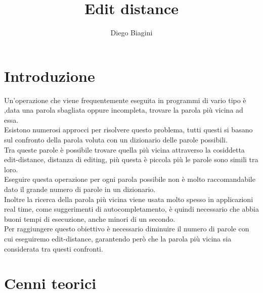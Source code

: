 \documentclass[]{article}
\author{Diego Biagini}
\title{Edit distance}
\begin{document}
\maketitle
\newpage
\section{Introduzione}
Un'operazione che viene frequentemente eseguita in programmi di vario tipo è ,data una parola sbagliata oppure incompleta, trovare la parola più vicina ad essa.\\
Esistono numerosi approcci per risolvere questo problema, tutti questi si basano sul confronto della parola voluta con un dizionario delle parole possibili.\\
Tra queste parole è possibile trovare quella più vicina attraverso la cosiddetta edit-distance, distanza di editing, più questa è piccola più le parole sono simili tra loro.\\
Eseguire questa operazione per ogni parola possibile non è molto raccomandabile dato il grande numero di parole in un dizionario.\\
Inoltre la ricerca della parola più vicina viene usata molto spesso in applicazioni real time, come suggerimenti di autocompletamento, è quindi necessario che abbia buoni tempi di esecuzione, anche minori di un secondo.\\
Per raggiungere questo obiettivo è necessario diminuire il numero di parole con cui eseguiremo edit-distance, garantendo però che la parola più vicina sia considerata tra questi confronti.\\
\section{Cenni teorici}
\end{document}
